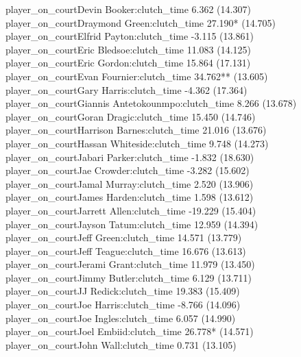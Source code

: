 \documentclass[
  landscape]{article}
\begin{document}
player\_on\_courtDevin Booker:clutch\_time 6.362 (14.307)\\
player\_on\_courtDraymond Green:clutch\_time 27.190* (14.705)\\
player\_on\_courtElfrid Payton:clutch\_time -3.115 (13.861)\\
player\_on\_courtEric Bledsoe:clutch\_time 11.083 (14.125)\\
player\_on\_courtEric Gordon:clutch\_time 15.864 (17.131)\\
player\_on\_courtEvan Fournier:clutch\_time 34.762** (13.605)\\
player\_on\_courtGary Harris:clutch\_time -4.362 (17.364)\\
player\_on\_courtGiannis Antetokounmpo:clutch\_time 8.266 (13.678)\\
player\_on\_courtGoran Dragic:clutch\_time 15.450 (14.746)\\
player\_on\_courtHarrison Barnes:clutch\_time 21.016 (13.676)\\
player\_on\_courtHassan Whiteside:clutch\_time 9.748 (14.273)\\
player\_on\_courtJabari Parker:clutch\_time -1.832 (18.630)\\
player\_on\_courtJae Crowder:clutch\_time -3.282 (15.602)\\
player\_on\_courtJamal Murray:clutch\_time 2.520 (13.906)\\
player\_on\_courtJames Harden:clutch\_time 1.598 (13.612)\\
player\_on\_courtJarrett Allen:clutch\_time -19.229 (15.404)\\
player\_on\_courtJayson Tatum:clutch\_time 12.959 (14.394)\\
player\_on\_courtJeff Green:clutch\_time 14.571 (13.779)\\
player\_on\_courtJeff Teague:clutch\_time 16.676 (13.613)\\
player\_on\_courtJerami Grant:clutch\_time 11.979 (13.450)\\
player\_on\_courtJimmy Butler:clutch\_time 6.129 (13.711)\\
player\_on\_courtJJ Redick:clutch\_time 19.383 (15.409)\\
player\_on\_courtJoe Harris:clutch\_time -8.766 (14.096)\\
player\_on\_courtJoe Ingles:clutch\_time 6.057 (14.990)\\
player\_on\_courtJoel Embiid:clutch\_time 26.778* (14.571)\\
player\_on\_courtJohn Wall:clutch\_time 0.731 (13.105)\\
\end{document}
